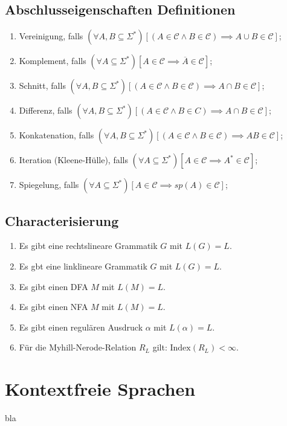 \documentclass[9pt]{article}
\begin{document}
\subsection{Abschlusseigenschaften Definitionen}
\begin{enumerate}
	\item Vereinigung, falls $(\forall A, B \subseteq \Sigma^*)[(A \in \mathcal{C} \wedge B \in \mathcal{ C}) \implies A \cup B \in \mathcal{C}]$;
	\item Komplement, falls $(\forall A \subseteq \Sigma^*)[A \in \mathcal{C} \implies \overline{A}\in\mathcal{C}]$;
	\item Schnitt, falls $(\forall A, B \subseteq \Sigma^*)[(A \in \mathcal{C} \wedge B \in \mathcal{C}) \implies A \cap B \in \mathcal{C}]$;
	\item Differenz, falls $(\forall A, B \subseteq \Sigma^*)[(A \in \mathcal{C} \wedge B \in C) \implies A \cap B \in \mathcal{C}]$;
	\item Konkatenation, falls $(\forall A, B \subseteq \Sigma^*)[(A \in \mathcal{C} \wedge B \in \mathcal{C})\implies AB \in \mathcal{C}]$;
	\item Iteration (Kleene-Hülle), falls $(\forall A \subseteq \Sigma^*)[A\in\mathcal{C}\implies A^*\in\mathcal{C}]$;
	\item Spiegelung, falls $(\forall A\subseteq \Sigma^*)[A\in\mathcal{C}\implies sp(A)\in\mathcal{C}]$;
\end{enumerate}
\subsection{Characterisierung}
\begin{enumerate}
	\item Es gibt eine rechtslineare Grammatik $G$ mit $L(G) = L$.
	\item Es gbt eine linklineare Grammatik $G$ mit $L(G)=L$.
	\item Es gibt einen DFA $M$ mit $L(M)=L$.
	\item Es gibt einen NFA $M$ mit $L(M)=L$.
	\item Es gibt einen regulären Ausdruck $\alpha$ mit $L(\alpha)=L$.
	\item Für die Myhill-Nerode-Relation $R_L$ gilt: $\text{Index}(R_L)<\infty$.
\end{enumerate}
\section{Kontextfreie Sprachen}
bla
\end{document}
